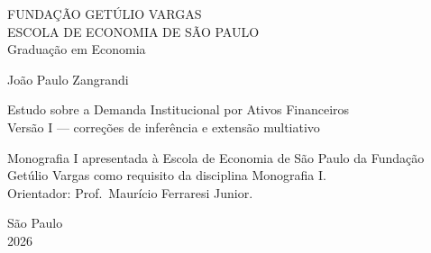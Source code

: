 \documentclass[12pt,a4paper]{article}
\begin{document}
\thispagestyle{empty}
\begin{center}
{\large FUNDAÇÃO GETÚLIO VARGAS}\\[2pt]
{\large ESCOLA DE ECONOMIA DE SÃO PAULO}\\[16pt]
{\normalsize Graduação em Economia}

\vspace{3.0cm}

{\large João Paulo Zangrandi}

\vspace{2.5cm}

{\Large Estudo sobre a Demanda Institucional por Ativos Financeiros}\\[6pt]
{\normalsize Versão I --- correções de inferência e extensão multiativo}

\vspace{2.5cm}

\begin{flushright}
\begin{minipage}{0.62\textwidth}
\small{}
Monografia I apresentada à Escola de Economia de São Paulo da Fundação Getúlio
Vargas como requisito da disciplina Monografia I.
\\[10pt]
Orientador: Prof.\ Maurício Ferraresi Junior.
\end{minipage}
\end{flushright}

\vfill

{\normalsize São Paulo}\\
{\normalsize 2026}
\end{center}

\newpage
\end{document}
